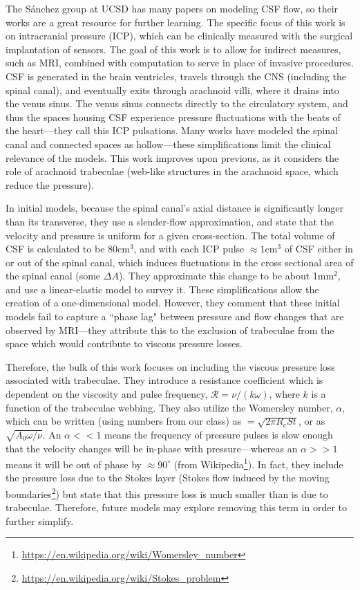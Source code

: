 The S\'{a}nchez group at UCSD has many papers on modeling CSF flow, so their works are a great resource for further learning. The specific focus of this work is on intracranial pressure (ICP), which can be clinically measured with the surgical implantation of sensors. The goal of this work is to allow for indirect measures, such as MRI, combined with computation to serve in place of invasive procedures. CSF is generated in the brain ventricles, travels through the CNS (including the spinal canal), and eventually exits through arachnoid villi, where it drains into the venus sinus. The venus sinus connects directly to the circulatory system, and thus the spaces housing CSF experience pressure fluctuations with the beats of the heart---they call this ICP pulsations. Many works have modeled the spinal canal and connected spaces as hollow---these simplifications limit the clinical relevance of the models. This work improves upon previous, as it considers the role of arachnoid trabeculae (web-like structures in the arachnoid space, which reduce the pressure).\newline

In initial models, because the spinal canal's axial distance is significantly longer than its transverse, they use a slender-flow approximation, and state that the velocity and pressure is uniform for a given cross-section. The total volume of CSF is calculated to be 80cm$^3$, and with each ICP pulse $\approx 1$cm$^3$ of CSF either in or out of the spinal canal, which induces fluctuations in the cross sectional area of the spinal canal (some $\Delta A$). They approximate this change to be about 1mm$^2$, and use a linear-elastic model to survey it. These simplifications allow the creation of a one-dimensional model. However, they comment that these initial models fail to capture a ``phase lag" between pressure and flow changes that are observed by MRI---they attribute this to the exclusion of trabeculae from the space which would contribute to viscous pressure losses.\newline

Therefore, the bulk of this work focuses on including the viscous pressure loss associated with trabeculae. They introduce a resistance coefficient which is dependent on the viscosity and pulse frequency, $\mathcal{R} =\nu / (k\omega)$, where $k$ is a function of the trabeculae webbing. They also utilize the Womersley number, $\alpha$, which can be written (using numbers from our class) as $=\sqrt{2\pi R_eSt}$, or as $\sqrt{A_0\omega /\nu}$. An $\alpha << 1$ means the frequency of pressure pulses is slow enough that the velocity changes will be in-phase with pressure---whereas an $\alpha >> 1$ means it will be out of phase by $\approx 90^\circ$ (from Wikipedia\footnote{\url{https://en.wikipedia.org/wiki/Womersley_number}}). In fact, they include the pressure loss due to the Stokes layer (Stokes flow induced by the moving boundaries\footnote{\url{https://en.wikipedia.org/wiki/Stokes_problem}}) but state that this pressure loss is much smaller than is due to trabeculae. Therefore, future models may explore removing this term in order to further simplify.  \newline

